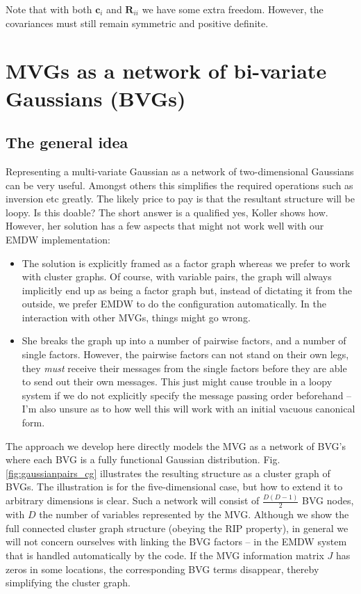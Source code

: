 Note that with both $\mathbf{c}_{i}$ and $\mathbf{R}_{ii}$ we have
some extra freedom. However, the covariances must still remain symmetric
and positive definite.


\section{MVGs as a network of bi-variate Gaussians (BVGs)}


\subsection{The general idea}

Representing a multi-variate Gaussian as a network of two-dimensional
Gaussians can be very useful. Amongst others this simplifies the required
operations such as inversion etc greatly. The likely price to pay
is that the resultant structure will be loopy. Is this doable? The
short answer is a qualified yes, Koller \cite[Section 14.2.3]{Koller2009}
shows how. However, her solution has a few aspects that might not
work well with our EMDW implementation:
\begin{itemize}
\item The solution is explicitly framed as a factor graph whereas we prefer
to work with cluster graphs. Of course, with variable pairs, the graph
will always implicitly end up as being a factor graph but, instead
of dictating it from the outside, we prefer EMDW to do the configuration
automatically. In the interaction with other MVGs, things might go
wrong.
\item She breaks the graph up into a number of pairwise factors, and a number
of single factors. However, the pairwise factors can not stand on
their own legs, they \emph{must }receive their messages from the single
factors before they are able to send out their own messages. This
just might cause trouble in a loopy system if we do not explicitly
specify the message passing order beforehand -- I'm also unsure as
to how well this will work with an initial vacuous canonical form.
\end{itemize}
The approach we develop here directly models the MVG as a network
of BVG's where each BVG is a fully functional Gaussian distribution.
Fig. \ref{fig:gaussianpairs_cg} illustrates the resulting structure
as a cluster graph of BVGs. The illustration is for the five-dimensional
case, but how to extend it to arbitrary dimensions is clear. Such
a network will consist of $\frac{D(D-1)}{2}$ BVG nodes, with $D$
the number of variables represented by the MVG. Although we show the
full connected cluster graph structure (obeying the RIP property),
in general we will not concern ourselves with linking the BVG factors
-- in the EMDW system that is handled automatically by the code. If
the MVG information matrix $J$ has zeros in some locations, the corresponding
BVG terms disappear, thereby simplifying the cluster graph.

